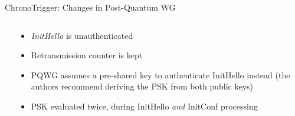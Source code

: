 \begin{frame}{ChronoTrigger: Changes in Post-Quantum WG}
\hypertarget{wireguard-and-post-quantum-wireguard}{}
  \begin{columns}[fullwidth,T]
    \begin{column}{.5\linewidth}
    \end{column}

    \begin{column}{.46\linewidth}
      \begin{itemize}
        \item \emph{InitHello} is unauthenticated
        \item Retransmission counter is kept
        \item PQWG assumes a pre-shared key to authenticate InitHello instead (the authors recommend deriving the PSK from both public keys)
        \item PSK evaluated twice, during InitHello \emph{and} InitConf processing
      \end{itemize}
    \end{column}
  \end{columns}
\end{frame}

